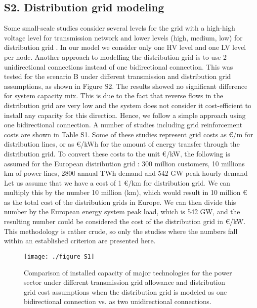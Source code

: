 	\subsection*{S2. Distribution grid modeling}
	
	Some small-scale studies consider several levels for the grid with a high-high voltage level for transmission network and lower levels (high, medium, low) for distribution grid . In our model we consider only one HV level and one LV level per node. Another approach to modelling the distribution grid is to use 2 unidirectional connections instead of one bidirectional connection. This was tested for the scenario B under different transmission and distribution grid assumptions, as shown in Figure S2. The results showed no significant difference for system capacity mix. This is due to the fact that reverse flows in the distribution grid are very low and the system does not consider it cost-efficient to install any capacity for this direction. Hence, we follow a simple approach using one bidirectional connection.
	A number of studies including grid reinforcement costs are shown in Table S1. Some of these studies represent grid costs as €/m for distribution lines, or as €/kWh for the amount of energy transfer through the distribution grid. To convert these costs to the unit €/kW, the following is assumed for the European distribution grid : 300 million customers, 10 millions km of power lines, 2800 annual TWh demand  and 542 GW peak hourly demand 
	Let us assume that we have a cost of 1 €/km for distribution grid. We can multiply this by the number 10 million (km), which would result in 10 million € as the total cost of the distribution grids in Europe. We can then divide this number by the European energy system peak load, which is 542 GW, and the resulting number could be considered the cost of the distribution grid in €/kW. This methodology is rather crude, so only the studies where the numbers fall within an established criterion are presented here.
	
	\begin{figure}[H]
		\renewcommand*{\thefigure}{S\arabic{figure}}
		\texttt{[image: ./figure S1]}
		\caption{Comparison of installed capacity of major technologies for the power sector under different transmission grid allowance and distribution grid cost assumptions when the distribution grid is modeled as one bidirectional connection vs. as two unidirectional connections. }
	\end{figure}
	
